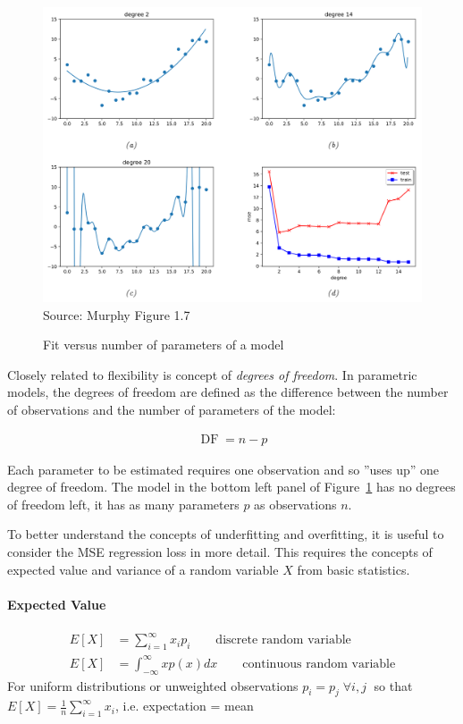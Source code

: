 \begin{figure}
\centering
\includegraphics[width=.9\textwidth]{screen2.png} \\

\scriptsize Source: Murphy Figure 1.7
\caption{Fit versus number of parameters of a model}
\label{fig:polynomial_chap11}
\end{figure}

Closely related to flexibility is concept of \emph{degrees of freedom}. In parametric models, the degrees of freedom are defined as the difference between the number of observations and the number of parameters of the model:

\begin{align*}
\operatorname{DF} = n - p
\end{align*}

\noindent Each parameter to be estimated requires one observation and so ''uses up'' one degree of freedom. The model in the bottom left panel of Figure~\ref{fig:polynomial_chap11} has no degrees of freedom left, it has as many parameters $p$ as observations $n$. 

To better understand the concepts of underfitting and overfitting, it is useful to consider the MSE regression loss in more detail. This requires the concepts of expected value and variance of a random variable $X$ from basic statistics.

\begin{tcolorbox}[colback=alert]
\paragraph*{Expected Value} 
\begin{align*}
E[X] &= \sum_{i=1}^{\infty} x_i p_i \qquad \text{discrete random variable}\\
E[X] &= \int_{-\infty}^{\infty} x p(x) dx \qquad \text{continuous random variable}
\end{align*}
For uniform distributions or unweighted observations $p_i=p_j \; \forall i, j \; $ so that $E[X] = \frac{1}{n} \sum_{i=1}^{\infty} x_i $, i.e. expectation = mean
\end{tcolorbox}

